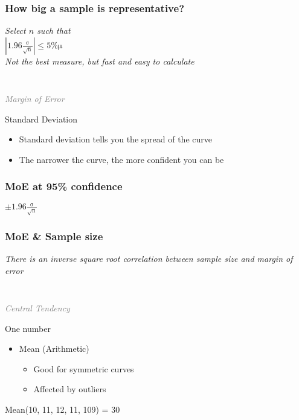 \documentclass{beamer}
\newcommand{\innersplash}[1]{
  \begin{center}
    \Large \textrm{\textit{ #1 } }
  \end{center}
}
\newcommand{\splashslide}[2][{}]{
  \begin{frame}
  \frametitle{#1}
  \innersplash{#2}
  \end{frame}
}
\newcommand{\leadinslide}[2]{
  \splashslide{
     {\fontsize{150}{20}\selectfont{\raisebox{0pt}[90pt][0pt]{\textcolor{light-gray}{#1}}}} \\ \huge \textcolor{gray}{#2}
  }
}
\begin{document}
\splashslide[How big a sample is representative?]{Select \(n\) such that \\ \medskip \LARGE \( \mathrm{\left| 1.96\frac{\sigma}{\sqrt{n}} \right| \le 5\% \mu} \) \\ \tiny Not the best measure, but fast and easy to calculate}

\leadinslide{1-2}{Margin of Error}

\begin{frame}{Standard Deviation}
  \begin{itemize}
  \item Standard deviation tells you the spread of the curve
  \item The narrower the curve, the more confident you can be
  \end{itemize}
  \parbox[c][0.58\paperheight]{\paperwidth}{ }
\end{frame}


\splashslide[MoE at 95\% confidence]{ \Huge \( \mathrm{\pm 1.96\frac{\sigma}{\sqrt{n}}} \) }

\splashslide[MoE \& Sample size]{There is an inverse square root correlation between sample size and margin of error}

\leadinslide{1-3}{Central Tendency}

\begin{frame}
\end{frame}

\begin{frame}{One number}
  \begin{itemize}
  \item Mean (Arithmetic)
    \begin{itemize}
    \item Good for symmetric curves
    \item Affected by outliers
    \end{itemize}
  \end{itemize}
  \begin{center}
  \Large{ Mean(10, 11, 12, 11, 109) = 30 }
  \end{center}
\end{frame}
\end{document}
